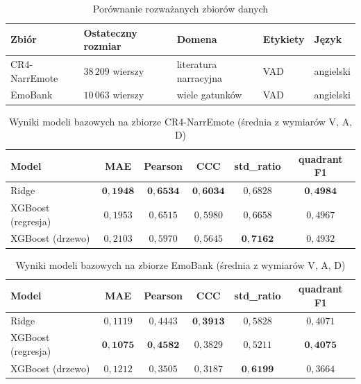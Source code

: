 \begin{table}[htbp]
  \centering
  \caption{Porównanie rozważanych zbiorów danych}
  \label{tab:datasets_comparison}
  \begin{tabular}{lllll}
    \toprule
    \textbf{Zbiór} & \textbf{Ostateczny rozmiar} & \textbf{Domena} & \textbf{Etykiety} & \textbf{Język} \\
    \midrule
    CR4-NarrEmote & $38\,209$ wierszy & literatura narracyjna & VAD & angielski \\
    EmoBank       & $10\,063$ wierszy & wiele gatunków        & VAD & angielski \\
    \bottomrule
  \end{tabular}
\end{table}

\begin{table}[!htbp]
  \centering
  \caption{Wyniki modeli bazowych na zbiorze CR4-NarrEmote (średnia z wymiarów V, A, D)}
  \label{tab:results_cr4}
  \begin{tabular}{lccccc}
    \toprule
    \textbf{Model} & \textbf{MAE} & \textbf{Pearson} & \textbf{CCC} & \textbf{std\_ratio} & \textbf{quadrant F1} \\
    \midrule
    Ridge               & $\mathbf{0{,}1948}$ & $\mathbf{0{,}6534}$ & $\mathbf{0{,}6034}$ & $0{,}6828$ & $\mathbf{0{,}4984}$ \\
    XGBoost (regresja)  & $0{,}1953$ & $0{,}6515$ & $0{,}5980$ & $0{,}6658$ & $0{,}4967$ \\
    XGBoost (drzewo)    & $0{,}2103$ & $0{,}5970$ & $0{,}5645$ & $\mathbf{0{,}7162}$ & $0{,}4932$ \\
    \bottomrule
  \end{tabular}
\end{table}

\begin{table}[!htbp]
  \centering
  \caption{Wyniki modeli bazowych na zbiorze EmoBank (średnia z wymiarów V, A, D)}
  \label{tab:results_emobank}
  \begin{tabular}{lccccc}
    \toprule
    \textbf{Model} & \textbf{MAE} & \textbf{Pearson} & \textbf{CCC} & \textbf{std\_ratio} & \textbf{quadrant F1} \\
    \midrule
    Ridge               & $0{,}1119$ & $0{,}4443$ & $\mathbf{0{,}3913}$ & $0{,}5828$ & $0{,}4071$ \\
    XGBoost (regresja)  & $\mathbf{0{,}1075}$ & $\mathbf{0{,}4582}$ & $0{,}3829$ & $0{,}5211$ & $\mathbf{0{,}4075}$ \\
    XGBoost (drzewo)    & $0{,}1212$ & $0{,}3505$ & $0{,}3187$ & $\mathbf{0{,}6199}$ & $0{,}3664$ \\
    \bottomrule
  \end{tabular}
\end{table}

